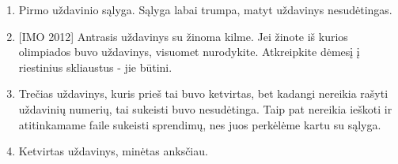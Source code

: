 \begin{enumerate}
  \item Pirmo uždavinio sąlyga. Sąlyga labai trumpa, matyt uždavinys
    nesudėtingas.
  \item {[IMO 2012]} Antrasis uždavinys su žinoma kilme. Jei žinote iš
    kurios olimpiados buvo uždavinys, visuomet nurodykite. Atkreipkite
    dėmesį į riestinius skliaustus - jie būtini.
  \item Trečias uždavinys, kuris prieš tai buvo ketvirtas, bet kadangi
    nereikia rašyti uždavinių numerių, tai sukeisti buvo nesudėtinga. Taip
    pat nereikia ieškoti ir atitinkamame faile sukeisti sprendimų, nes juos
    perkėlėme kartu su sąlyga.
  \item Ketvirtas uždavinys, minėtas anksčiau.
\end{enumerate}
